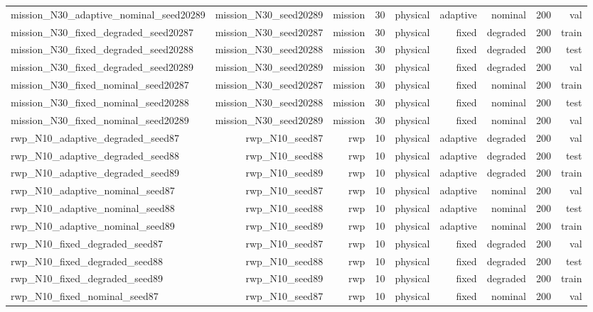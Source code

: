 \begin{tabular}{lrrrrrrrr}
mission\_N30\_adaptive\_nominal\_seed20289 & mission\_N30\_seed20289 & mission & 30 & physical & adaptive & nominal & 200 & val \\
mission\_N30\_fixed\_degraded\_seed20287 & mission\_N30\_seed20287 & mission & 30 & physical & fixed & degraded & 200 & train \\
mission\_N30\_fixed\_degraded\_seed20288 & mission\_N30\_seed20288 & mission & 30 & physical & fixed & degraded & 200 & test \\
mission\_N30\_fixed\_degraded\_seed20289 & mission\_N30\_seed20289 & mission & 30 & physical & fixed & degraded & 200 & val \\
mission\_N30\_fixed\_nominal\_seed20287 & mission\_N30\_seed20287 & mission & 30 & physical & fixed & nominal & 200 & train \\
mission\_N30\_fixed\_nominal\_seed20288 & mission\_N30\_seed20288 & mission & 30 & physical & fixed & nominal & 200 & test \\
mission\_N30\_fixed\_nominal\_seed20289 & mission\_N30\_seed20289 & mission & 30 & physical & fixed & nominal & 200 & val \\
rwp\_N10\_adaptive\_degraded\_seed87 & rwp\_N10\_seed87 & rwp & 10 & physical & adaptive & degraded & 200 & val \\
rwp\_N10\_adaptive\_degraded\_seed88 & rwp\_N10\_seed88 & rwp & 10 & physical & adaptive & degraded & 200 & test \\
rwp\_N10\_adaptive\_degraded\_seed89 & rwp\_N10\_seed89 & rwp & 10 & physical & adaptive & degraded & 200 & train \\
rwp\_N10\_adaptive\_nominal\_seed87 & rwp\_N10\_seed87 & rwp & 10 & physical & adaptive & nominal & 200 & val \\
rwp\_N10\_adaptive\_nominal\_seed88 & rwp\_N10\_seed88 & rwp & 10 & physical & adaptive & nominal & 200 & test \\
rwp\_N10\_adaptive\_nominal\_seed89 & rwp\_N10\_seed89 & rwp & 10 & physical & adaptive & nominal & 200 & train \\
rwp\_N10\_fixed\_degraded\_seed87 & rwp\_N10\_seed87 & rwp & 10 & physical & fixed & degraded & 200 & val \\
rwp\_N10\_fixed\_degraded\_seed88 & rwp\_N10\_seed88 & rwp & 10 & physical & fixed & degraded & 200 & test \\
rwp\_N10\_fixed\_degraded\_seed89 & rwp\_N10\_seed89 & rwp & 10 & physical & fixed & degraded & 200 & train \\
rwp\_N10\_fixed\_nominal\_seed87 & rwp\_N10\_seed87 & rwp & 10 & physical & fixed & nominal & 200 & val \\

\end{tabular}
